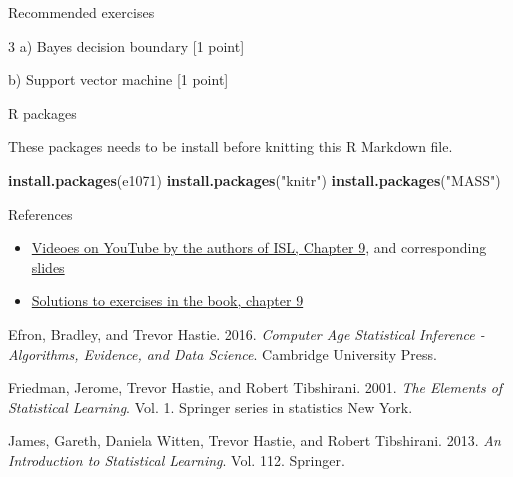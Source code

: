 \documentclass[ignorenonframetext,]{beamer}
\newenvironment{Shaded}{\begin{snugshade}}{\end{snugshade}}
\newcommand{\KeywordTok}[1]{\textcolor[rgb]{0.13,0.29,0.53}{\textbf{#1}}}
\newcommand{\StringTok}[1]{\textcolor[rgb]{0.31,0.60,0.02}{#1}}
\newcommand{\NormalTok}[1]{#1}
\providecommand{\tightlist}{%
  \setlength{\itemsep}{0pt}\setlength{\parskip}{0pt}}
\begin{document}
\begin{frame}[fragile]{Recommended exercises}
\begin{block}{3 a) Bayes decision boundary {[}1 point{]}}
\begin{block}{b) Support vector machine {[}1 point{]}}
\end{block}

\end{block}

\end{frame}

\begin{frame}[fragile]{R packages}

These packages needs to be install before knitting this R Markdown file.

\begin{Shaded}
\begin{Highlighting}[]
\KeywordTok{install.packages}\NormalTok{(e1071)}
\KeywordTok{install.packages}\NormalTok{(}\StringTok{"knitr"}\NormalTok{)}
\KeywordTok{install.packages}\NormalTok{(}\StringTok{"MASS"}\NormalTok{)}
\end{Highlighting}
\end{Shaded}

\end{frame}

\begin{frame}{References}

\begin{itemize}
\tightlist
\item
  \href{https://www.youtube.com/playlist?list=PL5-da3qGB5IDl6MkmovVdZwyYOhpCxo5o}{Videoes
  on YouTube by the authors of ISL, Chapter 9}, and corresponding
  \href{https://lagunita.stanford.edu/c4x/HumanitiesScience/StatLearning/asset/svm.pdf}{slides}
\item
  \href{https://rpubs.com/ppaquay/65566}{Solutions to exercises in the
  book, chapter 9}
\end{itemize}

\hypertarget{refs}{}
\hypertarget{ref-casi}{}
Efron, Bradley, and Trevor Hastie. 2016. \emph{Computer Age Statistical
Inference - Algorithms, Evidence, and Data Science}. Cambridge
University Press.

\hypertarget{ref-ESL}{}
Friedman, Jerome, Trevor Hastie, and Robert Tibshirani. 2001. \emph{The
Elements of Statistical Learning}. Vol. 1. Springer series in statistics
New York.

\hypertarget{ref-ISL}{}
James, Gareth, Daniela Witten, Trevor Hastie, and Robert Tibshirani.
2013. \emph{An Introduction to Statistical Learning}. Vol. 112.
Springer.

\end{frame}
\end{document}
